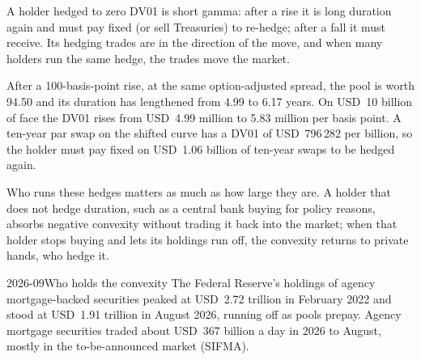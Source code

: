 A holder hedged to zero DV01 is short gamma: after a rise it is long duration again and
must pay fixed (or sell Treasuries) to re-hedge; after a fall it must receive. Its
hedging trades are in the direction of the move, and when many holders run the same
hedge, the trades move the market.

\begin{example}\label{ex:rc:mortgage-modelling:event}
After a 100-basis-point rise, at the same option-adjusted spread, the pool is worth 94.50
and its duration has lengthened from 4.99 to 6.17 years. On USD~10 billion of face the
DV01 rises from USD~4.99 million to 5.83 million per basis point. A ten-year par swap on
the shifted curve has a DV01 of USD~796\,282 per billion, so the holder must pay fixed on
USD~1.06 billion of ten-year swaps to be hedged again.
\end{example}

Who runs these hedges matters as much as how large they are. A holder that does not
hedge duration, such as a central bank buying for policy reasons, absorbs negative
convexity without trading it back into the market; when that holder stops buying and
lets its holdings run off, the convexity returns to private hands, who hedge it.

\begin{omfigure}

\label{fig:rc:mortgage-modelling:fed}
\end{omfigure}

\begin{dated}{2026-09}{Who holds the convexity}\label{dat:rc:mortgage-modelling:holders}
The Federal Reserve's holdings of agency mortgage-backed securities peaked at USD~2.72
trillion in February 2022 and stood at USD~1.91 trillion in August 2026, running off as
pools prepay. Agency mortgage securities traded about USD~367 billion a day in 2026 to
August, mostly in the to-be-announced market (SIFMA).
\end{dated}

